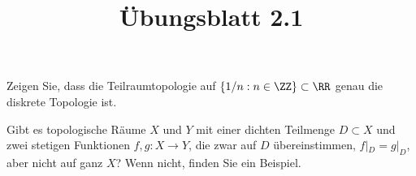 

\setcounter{Sheet}{2}

\title{Übungsblatt 2.1}

\setcounter{exercise}{4}


\maketitle
\begin{exercise}
Zeigen Sie, dass die Teilraumtopologie auf $\{1/n : n\in\ZZ\}\subset \RR$
genau die diskrete Topologie ist.
\end{exercise}

\begin{exercise}
Gibt es topologische Räume $X$ und $Y$ mit einer dichten Teilmenge $D\subset X$
und zwei stetigen Funktionen $f,g \colon X\to Y$, die zwar auf $D$
übereinstimmen, $f|_D = g|_D$, aber nicht auf ganz $X$? Wenn nicht, finden Sie
ein Beispiel.
\end{exercise}


